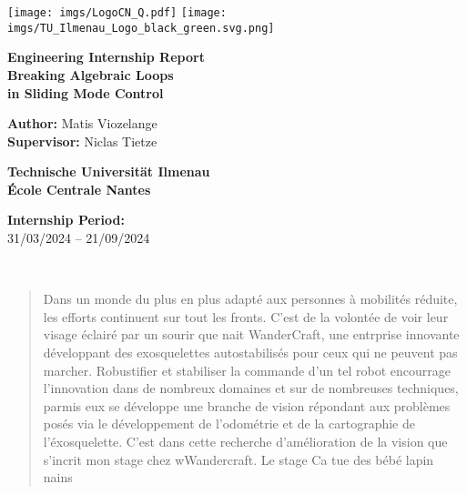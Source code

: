 \documentclass[a4paper, 12pt]{report}
\begin{document}
\renewcommand{\labelenumii}{\arabic{enumi}.\arabic{enumii}}

\begin{titlepage}
    \centering
    \vspace*{0cm}
    \texttt{[image: imgs/LogoCN\_Q.pdf]}\hfill
    \texttt{[image: imgs/TU\_Ilmenau\_Logo\_black\_green.svg.png]}
    
    \vspace{3cm}
    
    \Huge\textbf{Engineering Internship Report}\\
    \vspace{1cm}
    \LARGE\textbf{Breaking Algebraic Loops}\\
    \LARGE\textbf{in Sliding Mode Control}
    
    \vfill
    
    \Large\textbf{Author:} Matis Viozelange\\[0.3cm]
    \Large\textbf{Supervisor:} Niclas Tietze\\
    
    \vfill
    
    \Large\textbf{Technische Universität Ilmenau}\\
    \vspace{0.5cm}
    \Large\textbf{École Centrale Nantes}
    
    \vspace{1.5cm}
    
    \Large\textbf{Internship Period:}\\
    \Large 31/03/2024 -- 21/09/2024

    \vspace*{1cm}
\end{titlepage}

\newpage
\thispagestyle{empty}
~

\begin{abstract}
    Dans un monde du plus en plus adapté aux personnes à mobilités réduite, les efforts continuent sur tout les fronts. C'est de la volontée de voir leur visage éclairé par un sourir que nait WanderCraft, une entrprise innovante développant des exosquelettes autostabilisés pour ceux qui ne peuvent pas marcher. Robustifier et stabiliser la commande d'un tel robot encourrage l'innovation dans de nombreux domaines et sur de nombreuses techniques, parmis eux se développe une branche de vision répondant aux problèmes posés via le développement de l'odométrie et de la cartographie de l'éxosquelette. C'est dans cette recherche d'amélioration de la vision que s'incrit mon stage chez wWandercraft. Le stage Ca tue des bébé lapin nains
\end{abstract}
\end{document}
